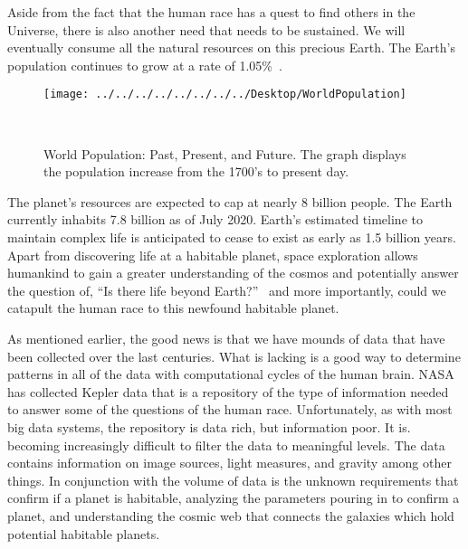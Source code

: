 \documentclass[letterpaper, 10 pt, conference]{ieeeconf}  %
\begin{document}
Aside from the fact that the human race has a quest to find others in the Universe, there is also another need that needs to be sustained. We will eventually consume all the natural resources on this precious Earth. The Earth's population continues to grow at a rate of 1.05\%~\cite{BASAK2020100335}. 

\begin{figure}
	\centering
	\texttt{[image: ../../../../../../../../Desktop/WorldPopulation]}
	\caption[World Population from 1700's to Present Day]{World Population: Past, Present, and Future. The graph displays the population increase from the 1700's to present day.}~\cite{PopulationClock202007}
	\label{fig:worldpopulation}
\end{figure}

The planet’s resources are expected to cap at nearly 8 billion people. The Earth currently inhabits 7.8 billion as of July 2020. Earth’s estimated timeline to maintain complex life is anticipated to cease to exist as early as 1.5 billion years. Apart from discovering life at a habitable planet, space exploration allows humankind to gain a greater understanding of the cosmos and potentially answer the question of, “Is there life beyond Earth?”~\cite{ScienceMissionDirectorate2020} and more importantly, could we catapult the human race to this newfound habitable planet.

As mentioned earlier, the good news is that we have mounds of data that have been collected over the last centuries. What is lacking is a good way to determine patterns in all of the data with computational cycles of the human brain. NASA has collected Kepler data that is a repository of the type of information needed to answer some of the questions of  the human race. Unfortunately, as with most big data systems, the repository is data rich, but information poor. It is. becoming increasingly difficult to filter the data to meaningful levels. The data contains information on image sources, light measures, and gravity among other things. In conjunction with the volume of data is the unknown requirements that confirm if a planet is habitable, analyzing the parameters pouring in to confirm a planet, and understanding the cosmic web that connects the galaxies which hold potential habitable planets. 
\end{document}
